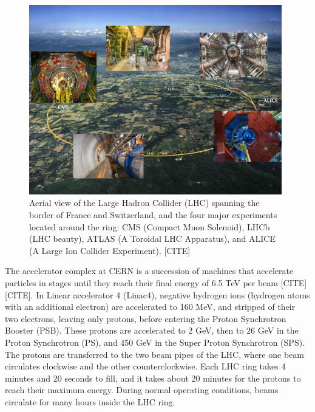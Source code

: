 \documentclass{article}
\begin{document}
\begin{figure}[ht]
    \centering
    \includegraphics[width=11cm]{figures/aerial-view-LHC-ring.jpeg}
    \caption{Aerial view of the Large Hadron Collider (LHC) spanning the border of France and Switzerland, and the four major experiments located around the ring: CMS (Compact Muon Solenoid), LHCb (LHC beauty), ATLAS (A Toroidal LHC Apparatus), and ALICE (A Large Ion Collider Experiment). [CITE]}
    \label{fig:aerial-view-LHC-ring}
\end{figure}

The accelerator complex at CERN is a succession of machines that accelerate particles in stages until they reach their final energy of 6.5 TeV per beam [CITE] [CITE]. In Linear accelerator 4 (Linac4), negative hydrogen ions (hydrogen atoms with an additional electron) are accelerated to 160 MeV, and stripped of their two electrons, leaving only protons, before entering the Proton Synchrotron Booster (PSB). These protons are accelerated to 2 GeV, then to 26 GeV in the Proton Synchrotron (PS), and 450 GeV in the Super Proton Synchrotron (SPS). The protons are transferred to the two beam pipes of the LHC, where one beam circulates clockwise and the other counterclockwise. Each LHC ring takes 4 minutes and 20 seconds to fill, and it takes about 20 minutes for the protons to reach their maximum energy. During normal operating conditions, beams circulate for many hours inside the LHC ring.
\end{document}
